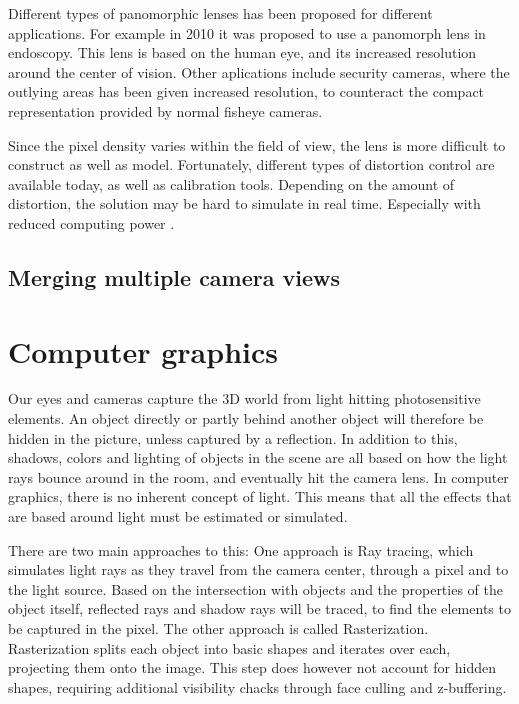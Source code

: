 Different types of panomorphic lenses has been proposed for different applications. For example in 2010 it was proposed to use a panomorph lens in endoscopy\cite{endoscopypano}. This lens is based on the human eye, and its increased resolution around the center of vision. Other aplications include security cameras, where the outlying areas has been given increased resolution, to counteract the compact representation provided by normal fisheye cameras.

Since the pixel density varies within the field of view, the lens is more difficult to construct as well as model. Fortunately, different types of distortion control are available today, as well as calibration tools. Depending on the amount of distortion, the solution may be hard to simulate in real time. Especially with reduced computing power .

\subsection{Merging multiple camera views}



\section{Computer graphics}

Our eyes and cameras capture the 3D world from light hitting photosensitive elements. An object directly or partly behind another object will therefore be hidden in the picture, unless captured by a reflection. In addition to this, shadows, colors and lighting of objects in the scene are all based on how the light rays bounce around in the room, and eventually hit the camera lens. In computer graphics, there is no inherent concept of light. This means that all the effects that are based around light must be estimated or simulated. 

There are two main approaches to this: One approach is Ray tracing, which simulates light rays as they travel from the camera center, through a pixel and to the light source. Based on the intersection with objects and the properties of the object itself, reflected rays and shadow rays will be traced, to find the elements to be captured in the pixel. The other approach is called Rasterization. Rasterization splits each object into basic shapes and iterates over each, projecting them onto the image. This step does however not account for hidden shapes, requiring additional visibility chacks through face culling and z-buffering. 

